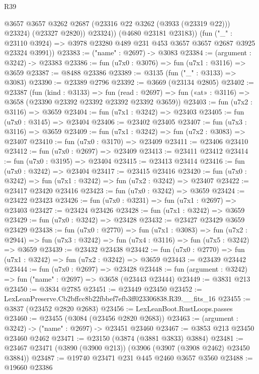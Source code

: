 \begin{lexlean}{R39}
\begin{coremodule}
                @3657
                @3657
                @3262
                @2687
                (@23316 @22 @3262 (@3933 (@23319 @22)))
                @23324)
              (@23327 @2820))
            @23324))
        (@4680 @23181 @23183))
      (fun ("_" : @23110 @3924) =>
      @3978 @23280 @489 @231 @453 @3657 @3657 @2687 @3925 @23324 @3991))
@23383 := ("name" : @2697) -> @3083
@23384 := (argument : @3242) -> @23383
@23386 := fun (u7x0 : @3076) => fun (u7x1 : @3116) => @3659
@23387 := @8488 @23386
@23389 := @3135 (fun ("_" : @3133) => @3083)
@23390 := @23389 @2796
@23392 := @3669 (@23134 @2805)
@23402 := @23387
    (fun (kind : @3133) =>
    fun (read : @2697) => fun («at» : @3116) => @3658 (@23390 @23392 @23392 @23392 @23392 @3659))
@23403 := fun (u7x2 : @3116) => @3659
@23404 := fun (u7x1 : @3242) => @23403
@23405 := fun (u7x0 : @3145) => @23404
@23406 := @23402 @23405
@23407 := fun (u7x3 : @3116) => @3659
@23409 := fun (u7x1 : @3242) => fun (u7x2 : @3083) => @23407
@23410 := fun (u7x0 : @3170) => @23409
@23411 := @23406 @23410
@23412 := fun (u7x0 : @2697) => @23409
@23413 := @23411 @23412
@23414 := fun (u7x0 : @3195) => @23404
@23415 := @23413 @23414
@23416 := fun (u7x0 : @3242) => @23404
@23417 := @23415 @23416
@23420 := fun (u7x0 : @3242) => fun (u7x1 : @3242) => fun (u7x2 : @3242) => @23407
@23422 := @23417 @23420 @23416
@23423 := fun (u7x0 : @3242) => @3659
@23424 := @23422 @23423
@23426 := fun (u7x0 : @3231) => fun (u7x1 : @2697) => @23403
@23427 := @23424 @23426
@23428 := fun (u7x1 : @3242) => @3659
@23429 := fun (u7x0 : @3242) => @23428
@23432 := @23427 @23429 @3659 @23429
@23438 := fun (u7x0 : @2770) =>
  fun (u7x1 : @3083) =>
  fun (u7x2 : @2944) => fun (u7x3 : @3242) => fun (u7x4 : @3116) => fun (u7x5 : @3242) => @3659
@23439 := @23432 @23438
@23442 := fun (u7x0 : @2770) => fun (u7x1 : @3242) => fun (u7x2 : @3242) => @3659
@23443 := @23439 @23442
@23444 := fun (u7x0 : @2697) => @23428
@23448 := fun (argument : @3242) => fun ("name" : @2697) => @3658 (@23443 @23444)
@23449 := @3831 @213
@23450 := @3834 @2785
@23451 := @23449 @23450
@23452 := LexLeanPreserve.Cb2bffcc8b22fbbef7efb3ff023306838.R39.__fits_16
@23455 := @3837 (@23452 @2820 @2683)
@23456 := LexLeanBoot.RustLoops.passes
@23460 := @23455 (@3084 (@23456 @2820 @2683))
@23463 := (argument : @3242) -> ("name" : @2697) -> @23451 @23460
@23467 := @3853 @213 @23450 @23460 @2462
@23471 := @23150 (@3874 (@3881 @3833) @3884)
@23481 := @23467 @23471 (@3890 (@3900 @213)) (@3906 (@3907 (@3908 @2462) @23450 @3884))
@23487 := @19740 @23471 @231 @445 @2460 @3657 @3560
@23488 := @19660 @23386

\end{coremodule}
\end{lexlean}
